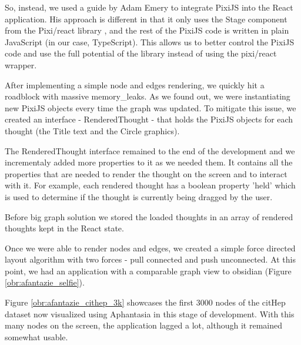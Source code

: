 So, instead, we used a guide by Adam Emery \cite{pixijs_adam_emery_guide} to integrate PixiJS into the React application.
His approach is different in that it only uses the Stage component from the Pixi/react library
, and the rest of the PixiJS code is written in plain JavaScript (in our case, TypeScript).
This allows us to better control the PixiJS code and use the full potential of the library instead of using the pixi/react wrapper.

After implementing a simple node and edges rendering, we quickly hit a roadblock with massive \glspl{memory_leak}.
As we found out, we were instantiating new PixiJS objects every time the graph was updated.
To mitigate this issue, we created an interface - RenderedThought - that holds the PixiJS objects for each thought (the Title text and the Circle graphics).

The RenderedThought interface remained to the end of the development and we incrementaly added more properties to it as we needed them.
It contains all the properties that are needed to render the thought on the screen and to interact with it.
For example, each rendered thought has a boolean property 'held' which is used to determine if the thought is currently being dragged by the user.

Before big graph solution we stored the loaded thoughts in an array of rendered thoughts kept in the React state.

Once we were able to render nodes and edges, we created a simple force directed layout algorithm with two forces - pull connected and push unconnected.
At this point, we had an application with a comparable graph view to obsidian (Figure \ref{obr:afantazie_selfie}).

Figure \ref{obr:afantazie_cithep_3k} showcases the first 3000 nodes of the citHep dataset now visualized using Aphantasia in this stage of development.
With this many nodes on the screen, the application lagged a lot, although it remained somewhat usable.

